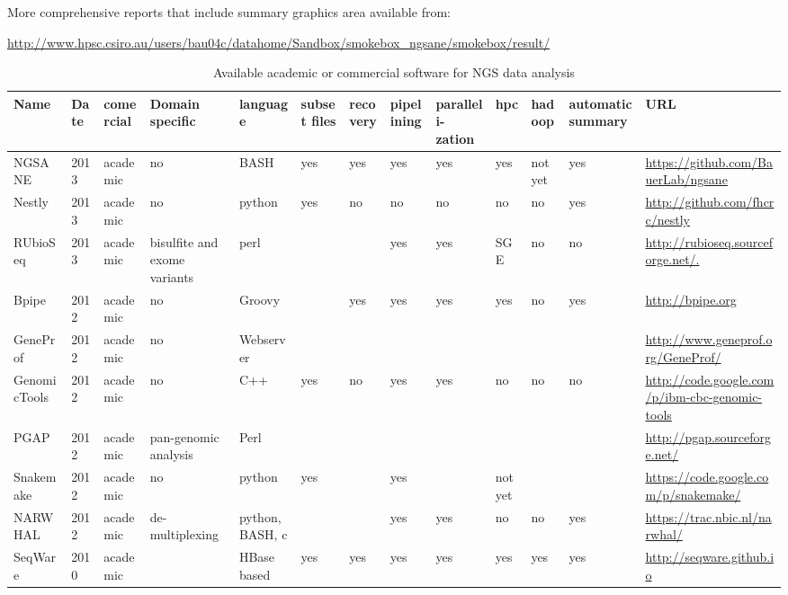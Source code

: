 \documentclass{article}
\begin{document}
More comprehensive reports that include summary graphics area available from:

\url{http://www.hpsc.csiro.au/users/bau04c/datahome/Sandbox/smokebox_ngsane/smokebox/result/}

\newpage

\begin{landscape}

\begin{table}[htdp]
\tiny 
\caption{Available academic or commercial software for NGS data analysis}
\begin{center}
\begin{tabular}{|p{2cm}|p{0.6cm}|p{1cm}|p{2cm}|p{1cm}|p{1cm}|p{1cm}|p{1cm}|p{1cm}|p{1cm}|p{1cm}|p{1cm}|p{4cm}|}
\hline
Name & Date & comercial & Domain specific & language & subset files & recovery & pipelining & paralleli-zation & hpc & hadoop & automatic summary & URL \\
\hline
NGSANE & 2013 & academic & no & BASH & yes & yes & yes & yes & yes & not yet & yes & \url{https://github.com/BauerLab/ngsane} \\
Nestly~\cite{McCoy2013} & 2013 & academic & no & python & yes & no & no & no & no & no & yes & \url{http://github.com/fhcrc/nestly} \\
RUbioSeq~\cite{Rubio-Camarillo2013} & 2013 & academic & bisulfite and exome variants & perl &  &  & yes & yes & SGE & no & no & \url{http://rubioseq.sourceforge.net/.} \\
Bpipe~\cite{Sadedin2012} & 2012 & academic & no & Groovy &  & yes & yes & yes & yes & no & yes & \url{http://bpipe.org} \\
GeneProf~\cite{Halbritter2012} & 2012 & academic & no & Webserver &  &  &  &  &  &  &  & \url{http://www.geneprof.org/GeneProf/} \\
GenomicTools~\cite{Tsirigos2012} & 2012 & academic & no & C++ & yes & no & yes & yes & no & no & no & \url{http://code.google.com/p/ibm-cbc-genomic-tools} \\
PGAP~\cite{Zhao2012} & 2012 & academic & pan-genomic analysis & Perl &  &  &  &  &  &  &  & \url{http://pgap.sourceforge.net/} \\
Snakemake~\cite{Koester2012} & 2012 & academic & no & python & yes &  & yes &  & not yet &  &  & \url{https://code.google.com/p/snakemake/} \\
NARWHAL~\cite{Brouwer2012} & 2012 & academic & de-multiplexing & python, BASH, c &  &  & yes & yes & no & no & yes & \url{https://trac.nbic.nl/narwhal/} \\
SeqWare~\cite{OConnor2010} & 2010 & academic &   &  HBase based & yes  & yes  & yes & yes & yes & yes &  yes & \url{http://seqware.github.io} \\

\end{tabular}
\end{center}
\end{table}
\end{landscape}
\end{document}
